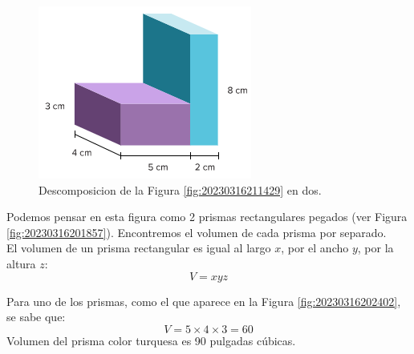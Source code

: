\begin{solutionbox}{16cm}
    \begin{minipage}[t]{.3\textwidth}
        \begin{figure}[H]
            \centering
            \includegraphics[width=0.9\linewidth]{../images/20230316211644}
            \caption{Descomposicion de la Figura \ref{fig:20230316211429} en dos.}
            \label{fig:20230316211644}
        \end{figure}
    \end{minipage}\hfill
    \begin{minipage}[t]{.55\textwidth}
        Podemos pensar en esta figura como 2 prismas rectangulares pegados (ver Figura \ref{fig:20230316201857}). Encontremos el volumen de cada prisma por separado.\\
        El volumen de un prisma rectangular es igual al largo $x$, por el ancho $y$, por la altura $z$:
        \[ V = xyz \]

        Para uno de los prismas, como el que aparece en la Figura \ref{fig:20230316202402}, se sabe que:\\
        \[ V = 5\times 4\times 3=60\]
        Volumen del prisma color turquesa es 90 pulgadas cúbicas.\\


\end{minipage}
\end{solutionbox}
